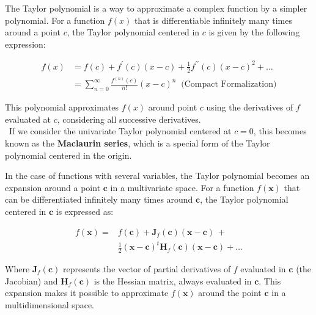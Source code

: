 \begin{minipage}{0.48\textwidth}
	
	\vspace{-1.59cm}
	
	
	
	The Taylor polynomial is a way to approximate a complex function by a simpler polynomial. For a function $f(x)$ that is differentiable infinitely many times around a point $c$, the Taylor polynomial centered in $c$ is given by the following expression:
	
	\vspace{-0.5cm}
	\[
		\begin{aligned}
			f(x) & =f(c)+f^{\prime}(c)(x-c)+\frac{1}{2} f^{\prime \prime}(c)(x-c)^{2}+\ldots                \\
			     & =\sum_{n=0}^{\infty} \frac{f^{(n)}(c)}{n !}(x-c)^{n} \;\; \text{(Compact Formalization)} 
		\end{aligned}
	\]
	
	This polynomial approximates $f(x)$ around point $c$ using the derivatives of $f$ evaluated at $c$, considering all successive derivatives. \\
	
	{\small \faLightbulb} \ If we consider the univariate Taylor polynomial centered at $c=0$, this becomes known as the \textbf{Maclaurin series}, which is a special form of the Taylor polynomial centered in the origin.
	
	\divider
	
	
	In the case of functions with several variables, the Taylor polynomial becomes an expansion around a point $\mathbf{c}$ in a multivariate space. For a function $f(\mathbf{x})$ that can be differentiated infinitely many times around $\mathbf{c}$, the Taylor polynomial centered in $\mathbf{c}$ is expressed as:
	
	\[
		\begin{aligned}
			f(\mathbf{x})= & f(\mathbf{c})+\mathbf{J}_{f}(\mathbf{c})(\mathbf{x}-\mathbf{c}) \ +                             \\
			               & \frac{1}{2}(\mathbf{x}-\mathbf{c})^{t} \mathbf{H}_{f}(\mathbf{c})(\mathbf{x}-\mathbf{c})+\ldots 
		\end{aligned}
	\]
	
	Where $\mathbf{J}_{f}(\mathbf{c})$ represents the vector of partial derivatives of $f$ evaluated in $\mathbf{c}$ (the Jacobian) and $\mathbf{H}_{f}(\mathbf{c})$ is the Hessian matrix, always evaluated in $\mathbf{c}$. This expansion makes it possible to approximate $f(\mathbf{x})$ around the point $\mathbf{c}$ in a multidimensional space.
	

\end{minipage}
